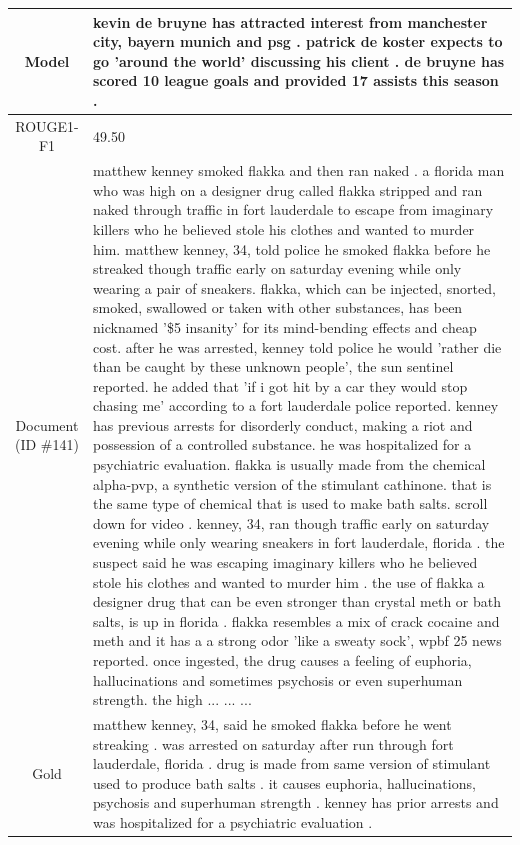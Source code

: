 \begin{table}[bth!]
\begin{tabular}{c|p{}}
\\ \hline
Model & 
kevin de bruyne has attracted interest from manchester city, bayern munich and psg . patrick de koster expects to go 'around the world' discussing his client . de bruyne has scored 10 league goals and provided 17 assists this season .
\\ \hline
ROUGE1-F1 & 
49.50
\\ \hline
\makecell{Document\\(ID \#141)} & 
matthew kenney smoked flakka and then ran naked . a florida man who was high on a designer drug called flakka stripped and ran naked through traffic in fort lauderdale to escape from imaginary killers who he believed stole his clothes and wanted to murder him. matthew kenney, 34, told police he smoked flakka before he streaked though traffic early on saturday evening while only wearing a pair of sneakers. flakka, which can be injected, snorted, smoked, swallowed or taken with other substances, has been nicknamed '\$5 insanity' for its mind-bending effects and cheap cost. after he was arrested, kenney told police he would 'rather die than be caught by these unknown people', the sun sentinel reported. he added that 'if i got hit by a car they would stop chasing me' according to a fort lauderdale police reported. kenney has previous arrests for disorderly conduct, making a riot and possession of a controlled substance. he was hospitalized for a psychiatric evaluation. flakka is usually made from the chemical alpha-pvp, a synthetic version of the stimulant cathinone. that is the same type of chemical that is used to make bath salts. scroll down for video . kenney, 34, ran though traffic early on saturday evening while only wearing sneakers in fort lauderdale, florida . the suspect said he was escaping imaginary killers who he believed stole his clothes and wanted to murder him . the use of flakka a designer drug that can be even stronger than crystal meth or bath salts, is up in florida . flakka resembles a mix of crack cocaine and meth and it has a a strong odor 'like a sweaty sock', wpbf 25 news reported. once ingested, the drug causes a feeling of euphoria, hallucinations and sometimes psychosis or even superhuman strength. the high ... ... ... 
\\ \hline
Gold & 
matthew kenney, 34, said he smoked flakka before he went streaking . was arrested on saturday after run through fort lauderdale, florida . drug is made from same version of stimulant used to produce bath salts . it causes euphoria, hallucinations, psychosis and superhuman strength . kenney has prior arrests and was hospitalized for a psychiatric evaluation .

\end{tabular}
\end{table}
